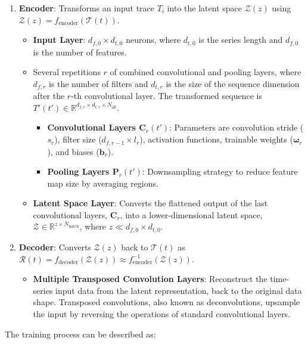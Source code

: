 \begin{enumerate}
    \item \textbf{Encoder}: Transforms an input trace $T_i$ into the latent space $\mathcal{Z}(z)$ using $\mathcal{Z}(z) = f_{\text{encoder}}(\mathcal{T}(t))$.
    \begin{itemize}
        \item \textbf{Input Layer}: \(d_{f,0} \times d_{t,0}\) neurons, where \(d_{t,0}\) is the series length and \(d_{f,0}\) is the number of features.
        \item Several repetitions \(r\) of combined convolutional and pooling layers, where \(d_{f,r}\) is the number of filters and \(d_{t,r}\) is the size of the sequence dimension after the \(r\)-th convolutional layer. The transformed sequence is \(T'(t') \in \mathbb{R}^{d_{f,r} \times d_{t,r} \times N_{\text{all}}}\).
        \begin{itemize}
            \item \textbf{Convolutional Layers ${\boldsymbol{C}}_{r}(t')$}: Parameters are convolution stride ($s_r$), filter size ($d_{f,r-1} \times l_r$), activation functions, trainable weights ($\boldsymbol{\omega}_r$), and biases ($\boldsymbol{b}_r$).
            \item \textbf{Pooling Layers $\boldsymbol{P}_r(t')$}: Downsampling strategy to reduce feature map size by averaging regions.
        \end{itemize}
        \item \textbf{Latent Space Layer}: Converts the flattened output of the last convolutional layers, $\boldsymbol{C}_r$, into a lower-dimensional latent space, $\mathcal{Z} \in \mathbb{R}^{z \times N_{\text{batch}}}$, where $z \ll d_{f,0} \times d_{t, 0}$.
    \end{itemize}
    \item \textbf{Decoder}: Converts $\mathcal{Z}(z)$ back to $\mathcal{T}(t)$ as $\mathcal{R}(t) = f_{\text{decoder}}(\mathcal{Z}(z)) \approx f_{\text{encoder}}^{-1}(\mathcal{Z}(z))$.
        \begin{itemize}
            \item \textbf{Multiple Transposed Convolution Layers}: Reconstruct the time-series input data from the latent representation, back to the original data shape. Transposed convolutions, also known as deconvolutions, upsample the input by reversing the operations of standard convolutional layers.
        \end{itemize}
\end{enumerate}
The training process can be described as:
